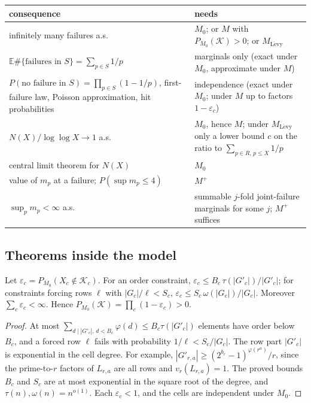 \begin{center}
\small
\begin{tabular}{p{}p{}}
\hline
consequence & needs\\
\hline
infinitely many failures a.s. & $M_0$; or $M$ with $P_{M_0}(\mathcal K)>0$;
                                 or $M_{\mathrm{L\acute evy}}$\\
$\mathbb E\#\{\text{failures in }S\}=\sum_{p\in S}1/p$ & marginals only
                                 (exact under $M_0$, approximate under $M$)\\
$P(\text{no failure in }S)=\prod_{p\in S}(1-1/p)$, first-failure law,
Poisson approximation, hit probabilities & independence (exact under $M_0$;
                                 under $M$ up to factors $1-\varepsilon_c$)\\
$N(X)/\log\log X\to1$ a.s. & $M_0$, hence $M$; under
                       $M_{\mathrm{L\acute evy}}$ only a lower bound $c$ on the
                       ratio to $\sum_{p\in R,\,p\leq X}1/p$\\
central limit theorem for $N(X)$ & $M_0$\\
value of $m_p$ at a failure; $P(\sup m_p\leq4)$ & $M^+$\\
$\sup_pm_p<\infty$ a.s. & summable $j$-fold joint-failure marginals for
                          some $j$; $M^+$ suffices\\
\hline
\end{tabular}
\end{center}

\subsection{Theorems inside the model}\label{sec:model-theorems}

\begin{lemma}\label{lem:model-K}
Let $\varepsilon_c=P_{M_0}(X_c\notin\mathcal K_c)$.  For an order constraint,
$\varepsilon_c\leq B_c\,\tau(|G'_c|)/|G'_c|$; for constraints forcing rows
$\ell$ with $|G_c|/\ell<S_c$, $\varepsilon_c\leq S_c\,\omega(|G_c|)/|G_c|$.
Moreover $\sum_c\varepsilon_c<\infty$.  Hence
$P_{M_0}(\mathcal K)=\prod_c(1-\varepsilon_c)>0$.
\end{lemma}

\begin{proof}
At most $\sum_{d\mid|G'_c|,\,d<B_c}\varphi(d)\leq B_c\tau(|G'_c|)$ elements
have order below $B_c$, and a forced row $\ell$ fails with probability
$1/\ell<S_c/|G_c|$.  The row part $|G'_c|$ is exponential in the cell
degree.  For example, $|G'_{r,a}|\geq(2^{b_r}-1)^{\varphi(r^a)}/r$, since the
prime-to-$r$ factors of $L_{r,a}$ are all rows and $v_r(L_{r,a})=1$.  The
proved bounds $B_c$ and $S_c$ are at most exponential in the square root of
the degree, and $\tau(n),\omega(n)=n^{o(1)}$.  Each $\varepsilon_c<1$, and
the cells are independent under $M_0$.
\end{proof}

